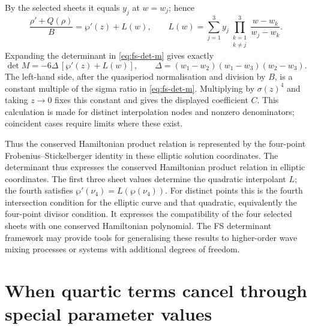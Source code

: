 \documentclass[11pt,a4paper]{article}
\begin{document}
By the selected sheets it equals $y_j$ at $w=w_j$; hence
\begin{equation}
\frac{\rho'+Q(\rho)}{B}=\wp'(z)+L(w),\qquad
L(w)=\sum_{j=1}^{3}y_j
\prod_{\substack{k=1\\k\ne j}}^{3}\frac{w-w_k}{w_j-w_k}.
\end{equation}
Expanding the determinant in \eqref{eq:fs-det-m} gives exactly
\begin{equation}
\det M=-6\Delta\,[\wp'(z)+L(w)],\qquad
\Delta=(w_1-w_2)(w_1-w_3)(w_2-w_3).
\end{equation}
The left-hand side, after the quasiperiod normalisation and division by $B$, is a constant multiple of the sigma ratio in \eqref{eq:fs-det-m}.
Multiplying by $\sigma(z)^4$ and taking $z\to0$ fixes this constant and gives the displayed coefficient $C$.
This calculation is made for distinct interpolation nodes and nonzero denominators; coincident cases require limits where these exist.

Thus the conserved Hamiltonian product relation is represented by the four-point Frobenius--Stickelberger identity in these elliptic solution coordinates.
The determinant thus expresses the conserved Hamiltonian product relation in elliptic coordinates.
The first three sheet values determine the quadratic interpolant $L$; the fourth satisfies $\wp'(\nu_4)=L(\wp(\nu_4))$.
For distinct points this is the fourth intersection condition for the elliptic curve and that quadratic, equivalently the four-point divisor condition.
It expresses the compatibility of the four selected sheets with one conserved Hamiltonian polynomial.
The FS determinant framework may provide tools for generalising these results to higher-order wave mixing processes or systems with additional degrees of freedom.



\section{When quartic terms cancel through special parameter values}
\label{supp:sec:cubic}
\end{document}
